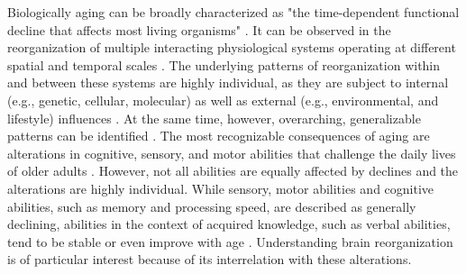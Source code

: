 Biologically aging can be broadly characterized as "the time-dependent functional decline that affects most living organisms" \cite{López-Otín2013}. It can be observed in the reorganization of multiple interacting physiological systems operating at different spatial and temporal scales \cite{Mooney2016}. The underlying patterns of reorganization within and between these systems are highly individual, as they are subject to internal (e.g., genetic, cellular, molecular) as well as external (e.g., environmental, and lifestyle) influences \cite{Smith2020, Mooney2016, Cohen2022}. At the same time, however, overarching, generalizable patterns can be identified \cite{Salthouse2019}. The most recognizable consequences of aging are alterations in cognitive, sensory, and motor abilities that challenge the daily lives of older adults \cite{Li2002}. However, not all abilities are equally affected by declines and the alterations are highly individual. While sensory, motor abilities and cognitive abilities, such as memory and processing speed, are described as generally declining, abilities in the context of acquired knowledge, such as verbal abilities, tend to be stable or even improve with age \cite{Park2009}. Understanding brain reorganization is of particular interest because of its interrelation with these alterations.

